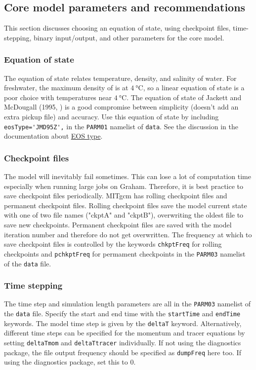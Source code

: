 \documentclass[11pt]{article}
\begin{document}
\subsection{Core model parameters and recommendations}
This section discusses choosing an equation of state, using checkpoint files, time-stepping, binary input/output, and other parameters for the core model.

\subsubsection{Equation of state}
The equation of state relates temperature, density, and salinity of water. For freshwater, the maximum density of is at $\SI{4}{\celsius}$, so a linear equation of state is a poor choice with temperatures near $\SI{4}{\celsius}$. The equation of state of Jackett and McDougall (1995, \cite{JackettMcDougall1995}) is a good compromise between simplicity (doesn't add an extra pickup file) and accuracy. Use this equation of state by including \verb|eosType='JMD95Z',| in the \verb|PARM01| namelist of \verb|data|. See the discussion in the documentation about \href{https://mitgcm.readthedocs.io/en/latest/getting_started/getting_started.html#parameters-equation-of-state}{EOS type}.

\subsubsection{Checkpoint files}
The model will inevitably fail sometimes. This can lose a lot of computation time especially when running large jobs on Graham. Therefore, it is best practice to save checkpoint files periodically. MITgcm has rolling checkpoint files and permanent checkpoint files. Rolling checkpoint files save the model current state with one of two file names ("ckptA" and "ckptB"), overwriting the oldest file to save new checkpoints. Permanent checkpoint files are saved with the model iteration number and therefore do not get overwritten. The frequency at which to save checkpoint files is controlled by the keywords \verb|chkptFreq| for rolling checkpoints and \verb|pchkptFreq| for permament checkpoints in the \verb|PARM03| namelist of the \verb|data| file.

\subsubsection{Time stepping}
The time step and simulation length parameters are all in the \verb|PARM03| namelist of the \verb|data| file. Specify the start and end time with the \verb|startTime| and \verb|endTime| keywords. The model time step is given by the \verb|deltaT| keyword. Alternatively, different time steps can be specified for the momentum and tracer equations by setting \verb|deltaTmom| and \verb|deltaTtracer| individually. If not using the diagnostics package, the file output frequency should be specified as \verb|dumpFreq| here too. If using the diagnostics package, set this to 0.
\end{document}
